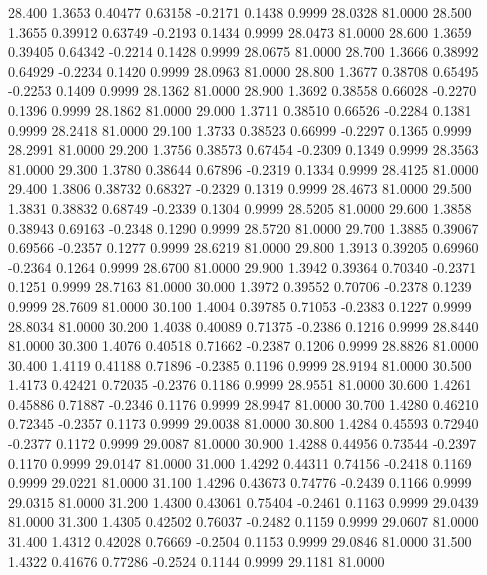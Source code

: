   28.400   1.3653   0.40477   0.63158  -0.2171   0.1438   0.9999  28.0328  81.0000
  28.500   1.3655   0.39912   0.63749  -0.2193   0.1434   0.9999  28.0473  81.0000
  28.600   1.3659   0.39405   0.64342  -0.2214   0.1428   0.9999  28.0675  81.0000
  28.700   1.3666   0.38992   0.64929  -0.2234   0.1420   0.9999  28.0963  81.0000
  28.800   1.3677   0.38708   0.65495  -0.2253   0.1409   0.9999  28.1362  81.0000
  28.900   1.3692   0.38558   0.66028  -0.2270   0.1396   0.9999  28.1862  81.0000
  29.000   1.3711   0.38510   0.66526  -0.2284   0.1381   0.9999  28.2418  81.0000
  29.100   1.3733   0.38523   0.66999  -0.2297   0.1365   0.9999  28.2991  81.0000
  29.200   1.3756   0.38573   0.67454  -0.2309   0.1349   0.9999  28.3563  81.0000
  29.300   1.3780   0.38644   0.67896  -0.2319   0.1334   0.9999  28.4125  81.0000
  29.400   1.3806   0.38732   0.68327  -0.2329   0.1319   0.9999  28.4673  81.0000
  29.500   1.3831   0.38832   0.68749  -0.2339   0.1304   0.9999  28.5205  81.0000
  29.600   1.3858   0.38943   0.69163  -0.2348   0.1290   0.9999  28.5720  81.0000
  29.700   1.3885   0.39067   0.69566  -0.2357   0.1277   0.9999  28.6219  81.0000
  29.800   1.3913   0.39205   0.69960  -0.2364   0.1264   0.9999  28.6700  81.0000
  29.900   1.3942   0.39364   0.70340  -0.2371   0.1251   0.9999  28.7163  81.0000
  30.000   1.3972   0.39552   0.70706  -0.2378   0.1239   0.9999  28.7609  81.0000
  30.100   1.4004   0.39785   0.71053  -0.2383   0.1227   0.9999  28.8034  81.0000
  30.200   1.4038   0.40089   0.71375  -0.2386   0.1216   0.9999  28.8440  81.0000
  30.300   1.4076   0.40518   0.71662  -0.2387   0.1206   0.9999  28.8826  81.0000
  30.400   1.4119   0.41188   0.71896  -0.2385   0.1196   0.9999  28.9194  81.0000
  30.500   1.4173   0.42421   0.72035  -0.2376   0.1186   0.9999  28.9551  81.0000
  30.600   1.4261   0.45886   0.71887  -0.2346   0.1176   0.9999  28.9947  81.0000
  30.700   1.4280   0.46210   0.72345  -0.2357   0.1173   0.9999  29.0038  81.0000
  30.800   1.4284   0.45593   0.72940  -0.2377   0.1172   0.9999  29.0087  81.0000
  30.900   1.4288   0.44956   0.73544  -0.2397   0.1170   0.9999  29.0147  81.0000
  31.000   1.4292   0.44311   0.74156  -0.2418   0.1169   0.9999  29.0221  81.0000
  31.100   1.4296   0.43673   0.74776  -0.2439   0.1166   0.9999  29.0315  81.0000
  31.200   1.4300   0.43061   0.75404  -0.2461   0.1163   0.9999  29.0439  81.0000
  31.300   1.4305   0.42502   0.76037  -0.2482   0.1159   0.9999  29.0607  81.0000
  31.400   1.4312   0.42028   0.76669  -0.2504   0.1153   0.9999  29.0846  81.0000
  31.500   1.4322   0.41676   0.77286  -0.2524   0.1144   0.9999  29.1181  81.0000
